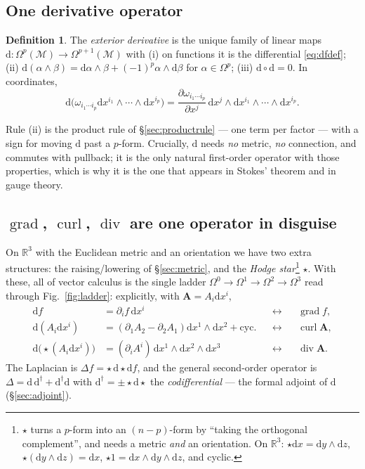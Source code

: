 \documentclass[10pt,a4paper]{article}
\newcommand{\dd}{\mathrm{d}}
\newcommand{\R}{\mathbb{R}}
\newcommand{\M}{\mathcal{M}}
\newcommand{\Om}{\Omega}
\newcommand{\pd}[2]{\frac{\partial #1}{\partial #2}}
\newcommand{\A}{\mathbf{A}}
\DeclareMathOperator{\grad}{grad}
\DeclareMathOperator{\curl}{curl}
\DeclareMathOperator{\dive}{div}
\theoremstyle{plain}
\theoremstyle{definition}
\newtheorem{defn}[thm]{Definition}
\numberwithin{equation}{section}
\begin{document}
\subsection{One derivative operator}
\label{sec:extd}

\begin{defn}\label{def:extd}
The \emph{exterior derivative} is the unique family of linear maps
$\dd:\Om^p(\M)\to\Om^{p+1}(\M)$ with (i) on functions it is the differential
\eqref{eq:dfdef}; (ii) $\dd(\alpha\wedge\beta)=\dd\alpha\wedge\beta+(-1)^p\alpha\wedge\dd\beta$
for $\alpha\in\Om^p$; (iii) $\dd\circ\dd=0$. In coordinates,
\begin{equation}
\dd\big(\omega_{i_1\cdots i_p}\dd x^{i_1}\wedge\cdots\wedge\dd x^{i_p}\big)
=\pd{\omega_{i_1\cdots i_p}}{x^j}\,\dd x^j\wedge\dd x^{i_1}\wedge\cdots\wedge\dd x^{i_p} .
\end{equation}
\end{defn}
\noindent Rule (ii) is the product rule of \S\ref{sec:productrule} --- one term per factor ---
with a sign for moving $\dd$ past a $p$-form. Crucially, $\dd$ needs \emph{no} metric, \emph{no}
connection, and commutes with pullback; it is the only natural first-order operator with those
properties, which is why it is the one that appears in Stokes' theorem and in gauge theory.

\subsection{$\grad$, $\curl$, $\dive$ are one operator in disguise}

On $\R^3$ with the Euclidean metric and an orientation we have two extra structures: the
raising/lowering of \S\ref{sec:metric}, and the \emph{Hodge star}\footnote{$\star$ turns a
$p$-form into an $(n-p)$-form by ``taking the orthogonal complement'', and needs a metric
\emph{and} an orientation. On $\R^3$: $\star\dd x=\dd y\wedge\dd z$,
$\star(\dd y\wedge\dd z)=\dd x$, $\star1=\dd x\wedge\dd y\wedge\dd z$, and cyclic.} $\star$.
With these, all of vector calculus is the single ladder
$\Om^0\to\Om^1\to\Om^2\to\Om^3$ read through Fig.~\ref{fig:ladder}: explicitly, with
$\A=A_i\dd x^i$,
\begin{align}
\dd f &= \partial_if\,\dd x^i && \longleftrightarrow && \grad f,\\
\dd(A_i\dd x^i) &= (\partial_1A_2-\partial_2A_1)\dd x^1\wedge\dd x^2+\text{cyc.}
  && \longleftrightarrow && \curl\A,\\
\dd\big(\star(A_i\dd x^i)\big) &= (\partial_iA^i)\,\dd x^1\wedge\dd x^2\wedge\dd x^3
  && \longleftrightarrow && \dive\A .
\end{align}
The Laplacian is $\Delta f=\star\,\dd\star\dd f$, and the general second-order operator is
$\Delta=\dd\,\dd^\dagger+\dd^\dagger\dd$ with $\dd^\dagger=\pm\star\dd\star$ the
\emph{codifferential} --- the formal adjoint of $\dd$ (\S\ref{sec:adjoint}).
\end{document}
